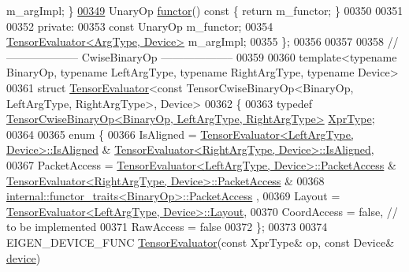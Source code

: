 \begin{DoxyCode}
      m\_argImpl; \}
\hyperlink{struct_eigen_1_1_tensor_evaluator_3_01const_01_tensor_cwise_unary_op_3_01_unary_op_00_01_arg_type_01_4_00_01_device_01_4_af6eec0085dcded391be5fbbb271ea82e}{00349}   UnaryOp \hyperlink{struct_eigen_1_1_tensor_evaluator_3_01const_01_tensor_cwise_unary_op_3_01_unary_op_00_01_arg_type_01_4_00_01_device_01_4_af6eec0085dcded391be5fbbb271ea82e}{functor}()\textcolor{keyword}{ const }\{ \textcolor{keywordflow}{return} m\_functor; \}
00350 
00351 
00352  \textcolor{keyword}{private}:
00353   \textcolor{keyword}{const} UnaryOp m\_functor;
00354   \hyperlink{struct_eigen_1_1_tensor_evaluator}{TensorEvaluator<ArgType, Device>} m\_argImpl;
00355 \};
00356 
00357 
00358 \textcolor{comment}{// -------------------- CwiseBinaryOp --------------------}
00359 
00360 \textcolor{keyword}{template}<\textcolor{keyword}{typename} BinaryOp, \textcolor{keyword}{typename} LeftArgType, \textcolor{keyword}{typename} RightArgType, \textcolor{keyword}{typename} Device>
00361 \textcolor{keyword}{struct }\hyperlink{struct_eigen_1_1_tensor_evaluator}{TensorEvaluator}<const TensorCwiseBinaryOp<BinaryOp, LeftArgType, RightArgType>, 
      Device>
00362 \{
00363   \textcolor{keyword}{typedef} \hyperlink{class_eigen_1_1_tensor_cwise_binary_op}{TensorCwiseBinaryOp<BinaryOp, LeftArgType, RightArgType>}
       \hyperlink{class_eigen_1_1_tensor_cwise_unary_op}{XprType};
00364 
00365   \textcolor{keyword}{enum} \{
00366     IsAligned = \hyperlink{struct_eigen_1_1_tensor_evaluator}{TensorEvaluator<LeftArgType, Device>::IsAligned}
       & \hyperlink{struct_eigen_1_1_tensor_evaluator}{TensorEvaluator<RightArgType, Device>::IsAligned},
00367     PacketAccess = \hyperlink{struct_eigen_1_1_tensor_evaluator}{TensorEvaluator<LeftArgType, Device>::PacketAccess}
       & \hyperlink{struct_eigen_1_1_tensor_evaluator}{TensorEvaluator<RightArgType, Device>::PacketAccess} &
00368                    \hyperlink{struct_eigen_1_1internal_1_1functor__traits}{internal::functor\_traits<BinaryOp>::PacketAccess}
      ,
00369     Layout = \hyperlink{struct_eigen_1_1_tensor_evaluator}{TensorEvaluator<LeftArgType, Device>::Layout},
00370     CoordAccess = \textcolor{keyword}{false},  \textcolor{comment}{// to be implemented}
00371     RawAccess = \textcolor{keyword}{false}
00372   \};
00373 
00374   EIGEN\_DEVICE\_FUNC \hyperlink{struct_eigen_1_1_tensor_evaluator}{TensorEvaluator}(\textcolor{keyword}{const} XprType& op, \textcolor{keyword}{const} Device& 
      \hyperlink{struct_eigen_1_1_tensor_evaluator_a98b51809ed8f7a1f736eb7b952b9636e}{device})

\end{DoxyCode}
